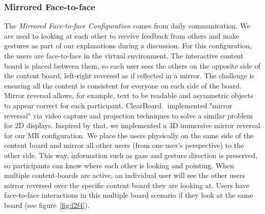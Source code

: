 \documentclass[chi_draft]{sigchi}
\begin{document}
\subsubsection{Mirrored Face-to-face} \label{mf2f}
The \textit{Mirrored Face-to-face Configuration} comes from daily communication. We are used to looking at each other to receive feedback from others and make gestures as part of our explanations during a discussion. For this configuration, the users are face-to-face in the virtual environment. The interactive content board is placed between them, so each user sees the others on the opposite side of the content board, left-right reversed as if reflected in a mirror. The challenge is ensuring all the content is consistent for everyone on each side of the board. Mirror reversal allows, for example, text to be readable and asymmetric objects to appear correct for each participant.
ClearBoard~\cite{ishii1993integration} implemented "mirror reversal" via video capture and projection techniques to solve a similar problem for 2D displays. Inspired by that, we implemented a 3D immersive mirror reversal for our MR configuration. We place the users physically on the same side of the content board and mirror all other users (from one user's perspective) to the other side. This way, information such as gaze and gesture direction is preserved, so participants can know where each other is looking and pointing. When multiple content-boards are active, an individual user will see the other users mirror reversed over the specific content board they are looking at. Users have face-to-face interactions in this multiple board scenario if they look at the same board (see figure~\ref{fig:f2f4}). 
\end{document}
